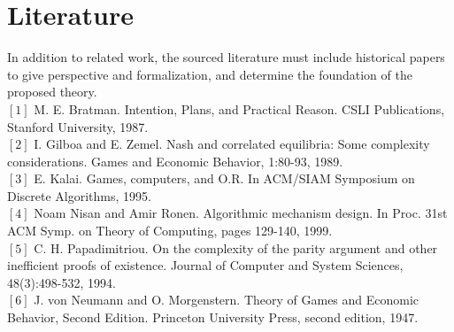\documentclass[10pt]{article}
\theoremstyle{definition}
\begin{document}
\section{Literature}

In addition to related work, the sourced literature must include historical
papers to give perspective and formalization, and determine the foundation of
the proposed theory.\\
$[1]$ M. E. Bratman. Intention, Plans, and Practical Reason. CSLI Publications, Stanford University,
1987.\\
$[2]$ I. Gilboa and E. Zemel. Nash and correlated equilibria: Some complexity considerations. Games
and Economic Behavior, 1:80-93, 1989.\\
$[3]$ E. Kalai. Games, computers, and O.R. In ACM/SIAM Symposium on Discrete Algorithms, 1995.\\
$[4]$ Noam Nisan and Amir Ronen. Algorithmic mechanism design. In Proc. 31st ACM Symp. on
Theory of Computing, pages 129-140, 1999.\\
$[5]$ C. H. Papadimitriou. On the complexity of the parity argument and other inefficient proofs of
existence. Journal of Computer and System Sciences, 48(3):498-532, 1994.\\
$[6]$ J. von Neumann and O. Morgenstern. Theory of Games and Economic Behavior, Second Edition.
Princeton University Press, second edition, 1947.\\
\end{document}
